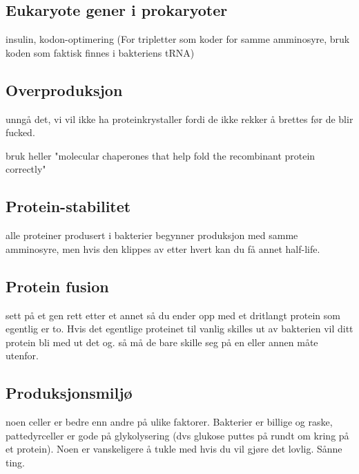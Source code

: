 \subsection{Eukaryote gener i prokaryoter}
    insulin, kodon-optimering (For tripletter som koder for samme amminosyre, bruk koden som faktisk finnes i bakteriens tRNA)


\subsection{Overproduksjon}
    unngå det, vi vil ikke ha proteinkrystaller fordi de ikke rekker å brettes før de blir fucked.

    bruk heller "molecular chaperones that help fold the recombinant protein correctly"


\subsection{Protein-stabilitet}
    alle proteiner produsert i bakterier begynner produksjon med samme amminosyre, men hvis den klippes av etter hvert kan du få annet half-life.

\subsection{Protein fusion}
    sett på et gen rett etter et annet så du ender opp med et dritlangt protein som egentlig er to. Hvis det egentlige proteinet 
    til vanlig skilles ut av bakterien vil ditt protein bli med ut det og. så må de bare skille seg på en eller annen måte utenfor. 

\subsection{Produksjonsmiljø}
    noen celler er bedre enn andre på ulike faktorer. Bakterier er billige og raske, pattedyrceller er gode på glykolysering 
    (dvs glukose puttes på rundt om kring på et protein).
    Noen er vanskeligere å tukle med hvis du vil gjøre det lovlig. Sånne ting.

